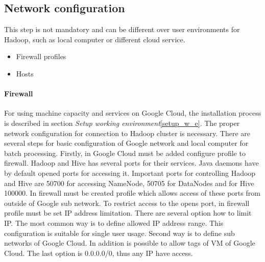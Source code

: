 \documentclass[a4paper,12pt,oneside]{report}
\begin{document}
	\subsection{Network configuration}
	This step is not mandatory and can be different over user environments for 
	Hadoop, such as local computer or different cloud service.  
	\begin{itemize}
		\item Firewall profiles
		\item Hosts
	\end{itemize}
	
	
	\paragraph{Firewall} For using machine capacity and services on Google Cloud, 
	the installation process is described in section \textit{Setup working
		environment}\ref{setup_w_e}. The proper network configuration for connection to
	Hadoop cluster is necessary. There are several steps for basic configuration of
	Google network and local computer for batch processing. Firstly, in Google Cloud
	must be added configure profile to firewall. Hadoop and Hive has several ports
	for their services. Java daemons have by default opened ports for accessing it.
	Important ports for controlling Hadoop and Hive are 50700 for accessing NameNode, 50705 for DataNodes
	and for Hive 100000. In firewall must be created profile which allows access of
	these ports from outside of Google sub network. To restrict access to the opens port,
	in firewall profile must be set IP address limitation. There are several option
	how to limit IP. The most common way is to define allowed IP address range. This
	configuration is suitable for single user usage. Second way is to define sub
	networks of Google Cloud. In addition is possible to allow tags of VM of Google
	Cloud. The last option is  0.0.0.0/0, thus any IP have access.
	
\end{document}
